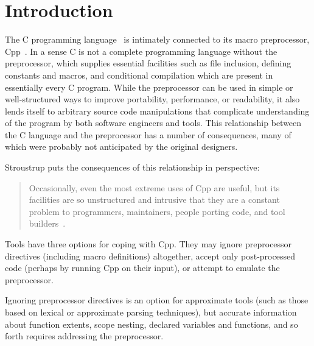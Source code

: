 \documentclass[11pt]{article}
\begin{document}
\section{Introduction}

The C programming language~\cite{ansi} is intimately connected to its macro
preprocessor, Cpp~\cite[Ch.3]{Harbison91}.  In a sense C is not a complete
programming language without the preprocessor, which supplies essential 
facilities such as
file inclusion, defining constants and macros, and conditional compilation
which are present in essentially every C program.   
While the preprocessor can be used in simple or well-structured ways to
improve portability, performance, or readability, it also lends itself to 
arbitrary source code manipulations that complicate understanding of the
program by both software engineers and tools.
This relationship
between the C language and the preprocessor has a number of consequences,
many of which were probably not anticipated by the original designers.

Stroustrup puts the consequences of this relationship in perspective:
\begin{quote}
Occasionally, even the most extreme uses of Cpp are useful, but its
facilities are so unstructured and intrusive that they are a constant
problem to programmers, maintainers, people porting code, and tool
builders~\cite[p.~424]{Stroustrup-DesignEvolution}.
\end{quote}

Tools have three options for coping with Cpp.  They may ignore preprocessor
directives (including macro definitions) altogether, accept only post-processed
code (perhaps by running Cpp on their input), or attempt to emulate the
preprocessor.

Ignoring preprocessor directives is an option for approximate tools
(such as those based on lexical or approximate parsing
techniques), but accurate information about function extents, scope
nesting, declared variables and functions, and so forth requires
addressing the preprocessor.
\end{document}
